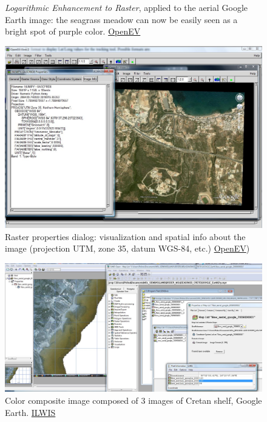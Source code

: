 \documentclass[11pt]{article}
\begin{document}
\begin{appendices}
\begin{figure}[H]
\begin{center}
	\caption{\textit{Logarithmic Enhancement to Raster}, applied to the aerial Google Earth image: the seagrass meadow can now be easily seen as a bright spot of purple color. \href{http://openev.sourceforge.net/}{OpenEV}}\label{fig:A.40}	
	\end{center}	
\end{figure}
\begin{figure}[H]
	\begin{center}
		\includegraphics[scale=0.25]{OpenEV-1.jpg}
		\caption{Raster properties dialog: visualization and spatial info about the image (projection UTM, zone 35, datum WGS-84, etc.)  \href{http://openev.sourceforge.net/}{OpenEV})}\label{fig:A.41}	
	\end{center}	
\end{figure}
\begin{figure}[H]
	\begin{center}
		\includegraphics[scale=0.25]{Ilwis-2.jpg}
		\caption{Color composite image composed of 3 images of Cretan shelf, Google Earth. \href{http://www.ilwis.org/}{ILWIS}}\label{fig:A.42}	

\end{center}
\end{figure}
\end{appendices}
\end{document}
